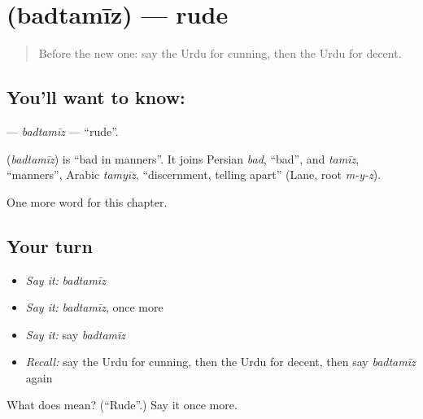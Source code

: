 \section[\texorpdfstring{\ur{بدتمیز} (badtamīz)}{بدتمیز (badtamīz)}]{ (badtamīz) — rude}

\label{lesson:UR-C223-badtamiz}



\begin{quote}
Before the new one: say the Urdu for cunning, then the Urdu for decent.
\end{quote}

\subsection*{You'll want to know: }
\textbf{} — \emph{badtamīz} — \textquotedblleft{}rude\textquotedblright{}.

\begin{cousinweb}
\textbf{} (\emph{badtamīz}) is \textquotedblleft{}bad in manners\textquotedblright{}. It joins Persian \emph{bad}, \textquotedblleft{}bad\textquotedblright{}, and \emph{tamīz}, \textquotedblleft{}manners\textquotedblright{}, Arabic \emph{tamyīz}, \textquotedblleft{}discernment, telling apart\textquotedblright{} (Lane, root \emph{m-y-z}).
\end{cousinweb}

\begin{grammarlens}[title={What you've built}]
One more word for this chapter.
\end{grammarlens}

\subsection*{Your turn}
\begin{itemize}
\raggedright
  \item \emph{Say it:} \emph{badtamīz}
  \item \emph{Say it:} \emph{badtamīz}, once more
  \item \emph{Say it:} say \emph{badtamīz}
  \item \emph{Recall:} say the Urdu for cunning, then the Urdu for decent, then say \emph{badtamīz} again
\end{itemize}

\begin{tcolorbox}[breakable,colback=teal!4,colframe=teal!35!black,title={Before you move on}]
What does  mean? (\textquotedblleft{}Rude\textquotedblright{}.) Say it once more.
\end{tcolorbox}
